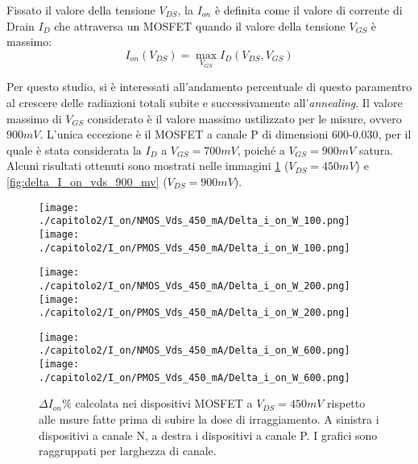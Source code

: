 Fissato il valore della tensione $V_{DS}$, la $I_{on}$ è definita come il valore di corrente di Drain $I_D$ che attraversa un MOSFET quando il valore della tensione $V_{GS}$ è massimo:
$$I_{on}(V_{DS}) = \max_{V_{GS}} I_D(V_{DS},V_{GS})$$

Per questo studio, si è interessati all'andamento percentuale di questo paramentro al crescere delle radiazioni totali subite e successivamente all'\emph{annealing}. Il valore massimo di $V_{GS}$ considerato è il valore massimo ustilizzato per le misure, ovvero $900 mV$. L'unica eccezione è il MOSFET a canale P di dimensioni 600-0.030, per il quale è stata considerata la $I_D$ a $V_{GS} = 700 mV$, poiché a $V_{GS} = 900mV$ satura. Alcuni risultati ottenuti sono mostrati nelle immagini \ref{fig:delta_I_on_vds_450_mv} ($V_{DS} = 450 mV$) e \ref{fig:delta_I_on_vds_900_mv} ($V_{DS} = 900 mV$).

\begin{figure}[h]
    \centering
    \texttt{[image: ./capitolo2/I\_on/NMOS\_Vds\_450\_mA/Delta\_i\_on\_W\_100.png]}
    \texttt{[image: ./capitolo2/I\_on/PMOS\_Vds\_450\_mA/Delta\_i\_on\_W\_100.png]}

    \vspace{0.5cm}
    \texttt{[image: ./capitolo2/I\_on/NMOS\_Vds\_450\_mA/Delta\_i\_on\_W\_200.png]}
    \texttt{[image: ./capitolo2/I\_on/PMOS\_Vds\_450\_mA/Delta\_i\_on\_W\_200.png]}

    \vspace{0.5cm}

    \texttt{[image: ./capitolo2/I\_on/NMOS\_Vds\_450\_mA/Delta\_i\_on\_W\_600.png]}
    \texttt{[image: ./capitolo2/I\_on/PMOS\_Vds\_450\_mA/Delta\_i\_on\_W\_600.png]}

    \caption[Dati $\Delta I_{on}\%$ a $V_{DS}=440mV$ ]{$\Delta I_{on}\%$ calcolata nei dispositivi MOSFET a $V_{DS} = 450mV$ rispetto alle msure fatte prima di subire la dose di irraggiamento. A sinistra i dispositivi a canale N, a destra i dispositivi a canale P. I grafici sono raggruppati per larghezza di canale.}
    \label{fig:delta_I_on_vds_450_mv}

\end{figure}

